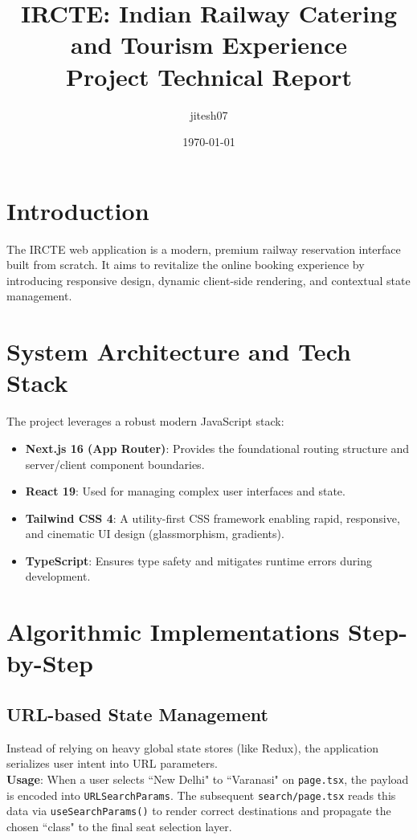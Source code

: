 \documentclass[12pt, a4paper]{article}
\title{\textbf{IRCTE: Indian Railway Catering and Tourism Experience}\\ \Large Project Technical Report}
\author{jitesh07}
\date{\today}
\begin{document}
\maketitle
\tableofcontents
\newpage

\section{Introduction}
The IRCTE web application is a modern, premium railway reservation interface built from scratch. It aims to revitalize the online booking experience by introducing responsive design, dynamic client-side rendering, and contextual state management. 

\section{System Architecture and Tech Stack}
The project leverages a robust modern JavaScript stack:
\begin{itemize}
    \item \textbf{Next.js 16 (App Router)}: Provides the foundational routing structure and server/client component boundaries.
    \item \textbf{React 19}: Used for managing complex user interfaces and state.
    \item \textbf{Tailwind CSS 4}: A utility-first CSS framework enabling rapid, responsive, and cinematic UI design (glassmorphism, gradients).
    \item \textbf{TypeScript}: Ensures type safety and mitigates runtime errors during development.
\end{itemize}

\section{Algorithmic Implementations Step-by-Step}

\subsection{URL-based State Management}
Instead of relying on heavy global state stores (like Redux), the application serializes user intent into URL parameters. 
\\
\textbf{Usage}: When a user selects ``New Delhi" to ``Varanasi" on \texttt{page.tsx}, the payload is encoded into \texttt{URLSearchParams}. The subsequent \texttt{search/page.tsx} reads this data via \texttt{useSearchParams()} to render correct destinations and propagate the chosen ``class" to the final seat selection layer.
\end{document}
